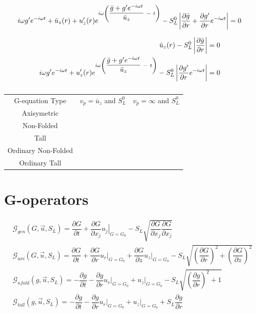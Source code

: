 \begin{theorem}
\begin{align}
	i \omega g' e^{-i\omega t} +   \bar{u}_z(r) + u'_z(r)e^{i\omega\left(\dfrac{\bar{g}+ g'e^{-i \omega t}}{\bar{u}_z}\ -\ t\right)}- S_L^0\modu{  \dfrac{\partial \bar{g}}{\partial r} + \dfrac{\partial g'}{\partial r} e^{-i \omega t}}=0 
\end{align}

\begin{align}
	\bar{u}_z(r) - S_L^0\left| \dfrac{\partial \bar{g}}{\partial r}\right|& =0 \\
i \omega g' e^{-i\omega t} + u'_z(r)e^{i\omega\left(\dfrac{\bar{g}+ g'e^{-i \omega t}}{\bar{u}_z}\ -\ t\right)}  - S_L^0 \left| \dfrac{\partial g'}{\partial r} e^{-i \omega t}\right|&=0
\end{align}
\end{theorem}


\begin{table}[!h]
\begin{center}
\begin{tabular}{c c c} \cmidrule[1pt]{1-3}
G-equation Type& $v_p=\bar{u}_z$ and $S_L^0$ & $v_p=\infty$ and $S_L^0$\\ \cmidrule{1-3}
Axisymetric & &\\
Non-Folded & &\\
Tall & &\\
Ordinary Non-Folded& &\\
Ordinary Tall & &\\ 
\bottomrule[1pt]
\end{tabular}
\end{center}
\caption{}
\label{}
\end{table}



\clearpage
\section{G-operators}
\begin{align}
&\mathcal{G}_{gen}(G,\vec{u},S_L)=\dfrac{\partial G}{\partial t} + \dfrac{\partial G}{\partial x_j} \left.u_j\right|_{G=G_0} - S_L \sqrt{\dfrac{\partial G}{\partial x_j}\dfrac{\partial G}{\partial x_j}}\\
&\mathcal{G}_{axi}(G,\vec{u},S_L)=\dfrac{\partial G}{\partial t} + \dfrac{\partial G}{\partial r} \left.u_r\right|_{G=G_0}+\dfrac{\partial G}{\partial z} \left.u_z\right|_{G=G_0} - S_L \sqrt{\left(\dfrac{\partial G}{\partial r}\right)^2+ \left(\dfrac{\partial G}{\partial z}\right)^2}\\
&\mathcal{G}_{nfold}(g,\vec{u},S_L)=-\dfrac{\partial g}{\partial t} - \dfrac{\partial g}{\partial r} \left.u_r\right|_{G=G_0}+\left.u_z\right|_{G=G_0} - S_L \sqrt{\left(\dfrac{\partial g}{\partial r}\right)^2+ 1}\\
&\mathcal{G}_{tall}(g,\vec{u},S_L)=-\dfrac{\partial g}{\partial t} - \dfrac{\partial g}{\partial r} \left.u_r\right|_{G=G_0}+\left.u_z\right|_{G=G_0} + S_L \dfrac{\partial g}{\partial r}
\end{align}

